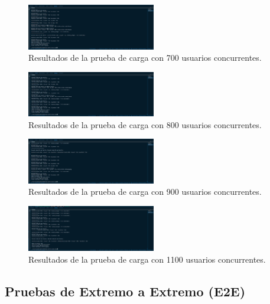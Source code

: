 \begin{figure}[H]
    \centering
    \includegraphics[width=0.5\textwidth]{figuras/pruebaCarga700U.png}
    \caption{Resultados de la prueba de carga con 700 usuarios concurrentes.}
    \label{fig:pruebaCarga700U}
\end{figure}

\begin{figure}[H]
    \centering
    \includegraphics[width=0.5\textwidth]{figuras/pruebaCarga800U.png}
    \caption{Resultados de la prueba de carga con 800 usuarios concurrentes.}
    \label{fig:pruebaCarga800U}
\end{figure}

\begin{figure}[H]
    \centering
    \includegraphics[width=0.5\textwidth]{figuras/pruebaCarga900U.png}
    \caption{Resultados de la prueba de carga con 900 usuarios concurrentes.}
    \label{fig:pruebaCarga900U}
\end{figure}

\begin{figure}[H]
    \centering
    \includegraphics[width=0.5\textwidth]{figuras/pruebaCarga1100U.png}
    \caption{Resultados de la prueba de carga con 1100 usuarios concurrentes.}
    \label{fig:pruebaCarga1100U}
\end{figure}

\subsection{Pruebas de Extremo a Extremo (E2E)}


